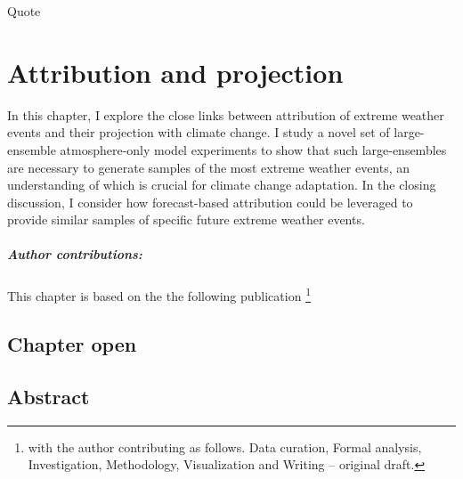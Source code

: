 \begin{savequote}[8cm]
    Quote
\end{savequote}
    
\chapter{\label{ch2}Attribution and projection} 

In this chapter, I explore the close links between attribution of extreme weather events and their projection with climate change. I study a novel set of large-ensemble atmosphere-only model experiments to show that such large-ensembles are necessary to generate samples of the most extreme weather events, an understanding of which is crucial for climate change adaptation. In the closing discussion, I consider how forecast-based attribution could be leveraged to provide similar samples of specific future extreme weather events.
\small\paragraph{Author contributions:} This chapter is based on the the following publication \footnote{with the author contributing as follows. Data curation, Formal analysis, Investigation, Methodology, Visualization and Writing -- original draft.} \par\vspace{1em}

\minitoc

\clearpage

\section{Chapter open}

\section{Abstract}

